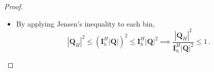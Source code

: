 \documentclass{article}
\numberwithin{equation}{section}
\begin{document}
\begin{proof}
\begin{itemize}
\begin{equation*}
\begin{aligned}
            &=\frac{(\bm{I}_h^H|\bm{Q}|)^2}{\bm{I}_h^H|\bm{Q}|^2}\leq 1\,,
        \end{aligned}
    \end{equation*}
    where the last element-wise inequality follows from Jensen's inequality applied to each bin. Hence, by exactly the same argument as the proof of the previous statement, we have
    \begin{equation*}
        \bm{I}_h^H\left|\frac{(\bm{I}_H^h\bm{Q}_H)\odot \bm{W}_{\bm{z}}}{\bm{Q}}\right|\leq 1 \implies \left|\frac{(\bm{I}_H^h\bm{Q}_H)\odot\bm{W}_{\bm{z}}}{\bm{Q}}\right|\leq 4\,,
    \end{equation*}
    where the inequalities are satisfied element-wise. We note the sharp bound for the last inequality is $3/2$, but its more involved derivation is omitted here.
    \item By applying Jensen's inequality to each bin, 
    \begin{equation*}
        |\bm{Q}_H|^2 \leq\left(\bm{I}_h^H|\bm{Q}|\right)^2\leq \bm{I}_h^H |\bm{Q}|^2\implies \frac{|\bm{Q}_H|^2}{\bm{I}_h^H|\bm{Q}|^2}
        \leq 1\,.
    \end{equation*}
\end{itemize}
\end{proof}
\end{document}
